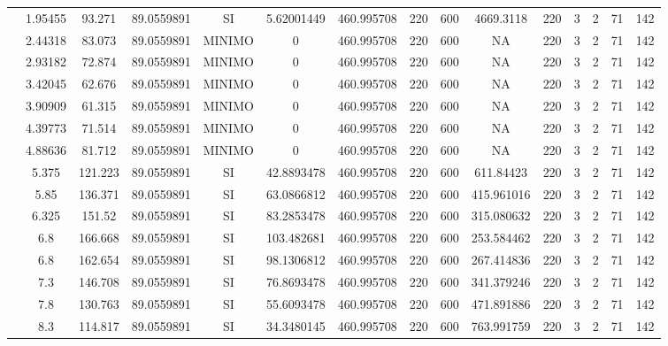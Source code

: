 \begin{table}[H]
{\begin{tabular}{|c|c|c|c|c|c|c|c|c|c|c|c|c|c|c|}
\cline{2-15}    & 1.95455 & 93.271 & 89.0559891 & SI  & 5.62001449 & 460.995708 & 220 & 600 & 4669.3118 & 220 & 3   & 2   & 71  & 142 \bigstrut\\
\cline{2-15}    & 2.44318 & 83.073 & 89.0559891 & MINIMO & 0   & 460.995708 & 220 & 600 & NA  & 220 & 3   & 2   & 71  & 142 \bigstrut\\
\cline{2-15}    & 2.93182 & 72.874 & 89.0559891 & MINIMO & 0   & 460.995708 & 220 & 600 & NA  & 220 & 3   & 2   & 71  & 142 \bigstrut\\
\cline{2-15}    & 3.42045 & 62.676 & 89.0559891 & MINIMO & 0   & 460.995708 & 220 & 600 & NA  & 220 & 3   & 2   & 71  & 142 \bigstrut\\
\cline{2-15}    & 3.90909 & 61.315 & 89.0559891 & MINIMO & 0   & 460.995708 & 220 & 600 & NA  & 220 & 3   & 2   & 71  & 142 \bigstrut\\
\cline{2-15}    & 4.39773 & 71.514 & 89.0559891 & MINIMO & 0   & 460.995708 & 220 & 600 & NA  & 220 & 3   & 2   & 71  & 142 \bigstrut\\
\cline{2-15}    & 4.88636 & 81.712 & 89.0559891 & MINIMO & 0   & 460.995708 & 220 & 600 & NA  & 220 & 3   & 2   & 71  & 142 \bigstrut\\
\cline{2-15}    & 5.375 & 121.223 & 89.0559891 & SI  & 42.8893478 & 460.995708 & 220 & 600 & 611.84423 & 220 & 3   & 2   & 71  & 142 \bigstrut\\
\cline{2-15}    & 5.85 & 136.371 & 89.0559891 & SI  & 63.0866812 & 460.995708 & 220 & 600 & 415.961016 & 220 & 3   & 2   & 71  & 142 \bigstrut\\
\cline{2-15}    & 6.325 & 151.52 & 89.0559891 & SI  & 83.2853478 & 460.995708 & 220 & 600 & 315.080632 & 220 & 3   & 2   & 71  & 142 \bigstrut\\
\cline{2-15}    & 6.8 & 166.668 & 89.0559891 & SI  & 103.482681 & 460.995708 & 220 & 600 & 253.584462 & 220 & 3   & 2   & 71  & 142 \bigstrut\\
\cline{2-15}    & 6.8 & 162.654 & 89.0559891 & SI  & 98.1306812 & 460.995708 & 220 & 600 & 267.414836 & 220 & 3   & 2   & 71  & 142 \bigstrut\\
\cline{2-15}    & 7.3 & 146.708 & 89.0559891 & SI  & 76.8693478 & 460.995708 & 220 & 600 & 341.379246 & 220 & 3   & 2   & 71  & 142 \bigstrut\\
\cline{2-15}    & 7.8 & 130.763 & 89.0559891 & SI  & 55.6093478 & 460.995708 & 220 & 600 & 471.891886 & 220 & 3   & 2   & 71  & 142 \bigstrut\\
\cline{2-15}    & 8.3 & 114.817 & 89.0559891 & SI  & 34.3480145 & 460.995708 & 220 & 600 & 763.991759 & 220 & 3   & 2   & 71  & 142 \bigstrut\\

\end{tabular}}
\end{table}
